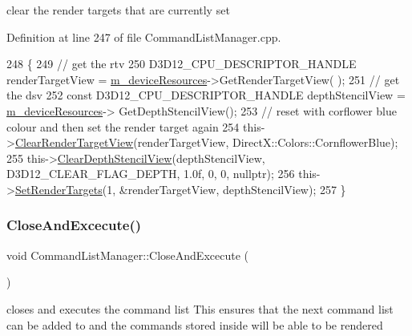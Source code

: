 clear the render targets that are currently set 



Definition at line 247 of file Command\+List\+Manager.\+cpp.


\begin{DoxyCode}
248 \{
249     \textcolor{comment}{// get the rtv}
250     D3D12\_CPU\_DESCRIPTOR\_HANDLE renderTargetView = \mbox{\hyperlink{class_command_list_manager_a1c48b5dc7b34886ce5057ac194a2385e}{m\_deviceResources}}->GetRenderTargetView(
      );
251     \textcolor{comment}{// get the dsv}
252     \textcolor{keyword}{const} D3D12\_CPU\_DESCRIPTOR\_HANDLE depthStencilView = \mbox{\hyperlink{class_command_list_manager_a1c48b5dc7b34886ce5057ac194a2385e}{m\_deviceResources}}->
      GetDepthStencilView();
253     \textcolor{comment}{// reset with corflower blue colour and then set the render target again}
254     this->\mbox{\hyperlink{class_command_list_manager_a3c7ee088fcfb3ce4cb8aee0ebfdc63e0}{ClearRenderTargetView}}(renderTargetView, DirectX::Colors::CornflowerBlue);    
255     this->\mbox{\hyperlink{class_command_list_manager_a2ed1b25ab6762e63d52c47dfa52d3a00}{ClearDepthStencilView}}(depthStencilView, D3D12\_CLEAR\_FLAG\_DEPTH, 1.0f, 0, 0, \textcolor{keyword}{
      nullptr});
256     this->\mbox{\hyperlink{class_command_list_manager_a44477586c6a56dbf51c7a73806ec9f71}{SetRenderTargets}}(1, &renderTargetView, depthStencilView);
257 \}
\end{DoxyCode}
\mbox{\label{class_command_list_manager_a9b533c23910ad61ac969fb35fbfc2c82}} 
\subsubsection{\texorpdfstring{Close\+And\+Excecute()}{CloseAndExcecute()}}
{\footnotesize\ttfamily void Command\+List\+Manager\+::\+Close\+And\+Excecute (\begin{DoxyParamCaption}{ }\end{DoxyParamCaption})}



closes and executes the command list This ensures that the next command list can be added to and the commands stored inside will be able to be rendered 



